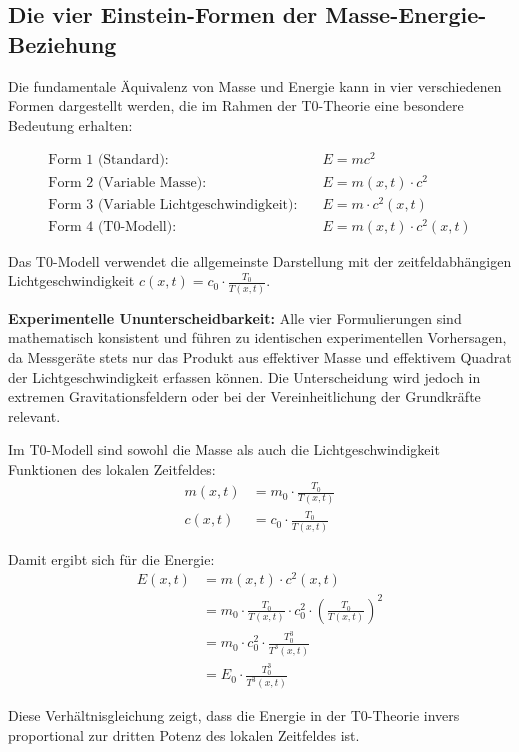 \documentclass[12pt,a4paper]{article}
\theoremstyle{definition}
\begin{document}
	\subsection{Die vier Einstein-Formen der Masse-Energie-Beziehung}
	
	Die fundamentale Äquivalenz von Masse und Energie kann in vier verschiedenen Formen dargestellt werden, die im Rahmen der T0-Theorie eine besondere Bedeutung erhalten:
	
	\begin{align}
		\text{Form 1 (Standard):} \quad & E = mc^2 \tag{14}\\
		\text{Form 2 (Variable Masse):} \quad & E = m(x,t) \cdot c^2 \tag{15}\\
		\text{Form 3 (Variable Lichtgeschwindigkeit):} \quad & E = m \cdot c^2(x,t) \tag{16}\\
		\text{Form 4 (T0-Modell):} \quad & E = m(x,t) \cdot c^2(x,t) \tag{17}
	\end{align}
	
	Das T0-Modell verwendet die allgemeinste Darstellung mit der zeitfeldabhängigen Lichtgeschwindigkeit $c(x,t) = c_0 \cdot \frac{T_0}{T(x,t)}$.
	
	\begin{wichtig}
		\textbf{Experimentelle Ununterscheidbarkeit:} Alle vier Formulierungen sind mathematisch konsistent und führen zu identischen experimentellen Vorhersagen, da Messgeräte stets nur das Produkt aus effektiver Masse und effektivem Quadrat der Lichtgeschwindigkeit erfassen können. Die Unterscheidung wird jedoch in extremen Gravitationsfeldern oder bei der Vereinheitlichung der Grundkräfte relevant.
	\end{wichtig}
	
	\begin{verhaltnis}
		Im T0-Modell sind sowohl die Masse als auch die Lichtgeschwindigkeit Funktionen des lokalen Zeitfeldes:
		\begin{align}
			m(x,t) &= m_0 \cdot \frac{T_0}{T(x,t)}\\
			c(x,t) &= c_0 \cdot \frac{T_0}{T(x,t)}
		\end{align}
		
		Damit ergibt sich für die Energie:
		\begin{align}
			E(x,t) &= m(x,t) \cdot c^2(x,t)\\
			&= m_0 \cdot \frac{T_0}{T(x,t)} \cdot c_0^2 \cdot \left(\frac{T_0}{T(x,t)}\right)^2\\
			&= m_0 \cdot c_0^2 \cdot \frac{T_0^3}{T^3(x,t)}\\
			&= E_0 \cdot \frac{T_0^3}{T^3(x,t)}
		\end{align}
		
		Diese Verhältnisgleichung zeigt, dass die Energie in der T0-Theorie invers proportional zur dritten Potenz des lokalen Zeitfeldes ist.
	\end{verhaltnis}
	
\end{document}
